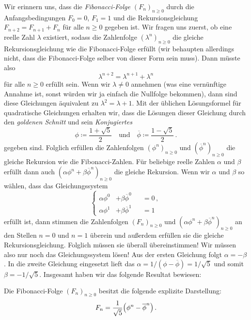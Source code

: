 Wir erinnern uns, dass die \emph{Fibonacci-Folge $(F_n)_{n\geqslant 0}$} durch die Anfangsbedingungen $F_0=0$, $F_1=1$ und die Rekursionsgleichung $F_{n+2}=F_{n+1}+F_n$ für alle $n \geqslant 0$ gegeben ist. Wir fragen uns zuerst, ob eine reelle Zahl $\lambda$ existiert, sodass die Zahlenfolge $(\lambda^n)_{n\geqslant 0}$ die gleiche Rekursionsgleichung wie die Fibonacci-Folge erfüllt (wir behaupten allerdings nicht, dass die Fibonacci-Folge selber von dieser Form sein muss). Dann müsste also
\begin{equation*}
	\lambda^{n+2}=\lambda^{n+1}+\lambda^n
\end{equation*}
für alle $n\geqslant 0$ erfüllt sein. Wenn wir $\lambda\neq 0$ annehmen (was eine vernünftige Annahme ist, sonst würden wir ja einfach die Nullfolge bekommen), dann sind diese Gleichungen äquivalent zu $\lambda^2=\lambda+1$. Mit der üblichen Lösungsformel für quadratische Gleichungen erhalten wir, dass die Lösungen dieser Gleichung durch den \emph{goldenen Schnitt} und sein \emph{Konjugiertes}
\begin{equation*}
	\phi\coloneqq\frac{1+\sqrt{5}}{2}\quad\text{und}\quad \overline{\phi}\coloneqq\frac{1-\sqrt
		5}{2}\,.
\end{equation*}
gegeben sind. Folglich erfüllen die Zahlenfolgen $(\phi^n)_{n\geqslant 0}$ und $(\overline{\phi}^n)_{n\geqslant 0}$ die gleiche Rekursion wie die Fibonacci-Zahlen. Für beliebige reelle Zahlen $\alpha$ und $\beta$ erfüllt dann auch $(\alpha\phi^n+\beta\overline{\phi}^n)_{n\geqslant 0}$ die gleiche Rekursion. Wenn wir $\alpha$ und $\beta$ so wählen, dass das Gleichungssystem
\begin{equation*}
	\left\{\begin{alignedat}{2}
		\alpha\phi^0&+\beta\overline{\phi}^0&&=0\,,\\
		\alpha\phi^1&+\beta\overline{\phi}^1&&=1
	\end{alignedat}\right.
\end{equation*}
erfüllt ist, dann stimmen die Zahlenfolgen $(F_n)_{n\geqslant 0}$ und $(\alpha\phi^n+\beta\overline{\phi}^n)_{n\geqslant 0}$ an den Stellen $n=0$ und $n=1$ überein und außerdem erfüllen sie die gleiche Rekursionsgleichung. Folglich müssen sie überall übereinstimmen! Wir müssen also nur noch das Gleichungssystem lösen! Aus der ersten Gleichung folgt $\alpha=-\beta$. In die zweite Gleichung eingesetzt lieft das $\alpha=1/(\phi-\overline{\phi})=1/{\sqrt{5}}$ und somit $\beta=-1/{\sqrt{5}}$. Insgesamt haben wir das folgende Resultat bewiesen:
\begin{satzmitnamen}
	Die Fibonacci-Folge $(F_n)_{n\geqslant 0}$ besitzt die folgende explizite Darstellung:
	\begin{equation*}
		F_n=\frac{1}{\sqrt{5}}\parens*{\phi^n-\overline{\phi}^n}\,.
	\end{equation*}
\end{satzmitnamen}
